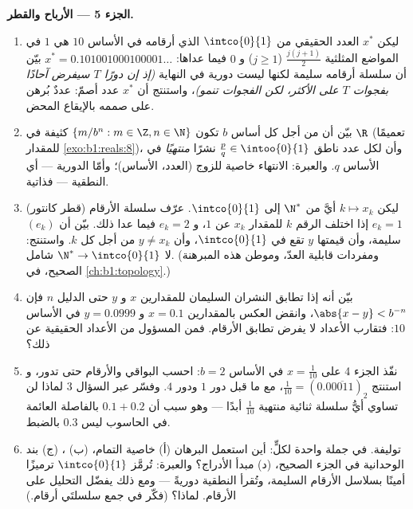 \begin{problem}
\medskip
\noindent\textbf{الجزء 5 --- الأرباح والقطر.}
\begin{enumerate}[resume]
  \item ليكن $x^*$ العدد الحقيقي من $\intco{0}{1}$ الذي أرقامه
        في الأساس $10$ هي $1$ في المواضع المثلثية $\frac{j(j +
        1)}{2}$ ($j \geq 1$) و $0$ فيما عداها: $x^* =
        0.101001000100001\dots$ بيّن أن سلسلة أرقامه
        سليمة لكنها ليست دورية في النهاية \emph{(إذ إن دورًا $T$
        سيفرض آحادًا بفجوات $T$ على الأكثر، لكن الفجوات تنمو)}،
        واستنتج أن $x^*$ عدد أصمّ: عددٌ بُرهن على صممه
        بالإيقاع المحض.
  \item بيّن أن من أجل كل أساس $b$ تكون  $\{m/b^n : m \in \Z,
        n \in \N\}$ كثيفة في $\R$ (تعميمًا للمقدار
        \cref{exo:b1:reals:8})، وأن لكل عدد ناطق $\frac pq
        \in \intoo{0}{1}$ نشرًا \emph{منتهيًا} في
        الأساس $q$. والعبرة: الانتهاء خاصية للزوج
        (العدد، الأساس)؛ وأمّا الدورية --- أي النطقية --- فذاتية.
  \item (قطر كانتور) ليكن $k \mapsto x_k$ أيَّ  من
        $\N^*$ إلى $\intco{0}{1}$. عرّف سلسلة الأرقام $e_k =
        1$ إذا اختلف الرقم $k$ للمقدار $x_k$ عن $1$، و
        $e_k = 2$ فيما عدا ذلك. بيّن أن $(e_k)$ سليمة، وأن
        قيمتها $y$ تقع في $\intco{0}{1}$، وأن $y \neq
        x_k$ من أجل كل $k$. واستنتج: لا  $\N^* \to
        \intco{0}{1}$ شامل. (ومفردات
        قابلية العدّ، وموطن هذه المبرهنة الصحيح، في
        \cref{ch:b1:topology}.)
  \item بيّن أنه إذا تطابق النشران السليمان للمقدارين $x$ و $y$
        حتى الدليل $n$ فإن $\abs{x - y} < b^{-n}$، وانقض
        العكس بالمقدارين $x = 0.1$ و $y = 0.0999$ في الأساس $10$:
        فتقارب الأعداد لا يفرض تطابق الأرقام.
        فمن المسؤول من الأعداد الحقيقية عن ذلك؟
  \item نفّذ الجزء 4 على $x = \frac{1}{10}$ في الأساس $b = 2$:
        احسب البواقي والأرقام حتى تدور، و
        استنتج $\frac{1}{10} = (0.0\overline{0011})_2$، مع
        ما قبل دور $1$ ودور $4$. وفسّر عبر السؤال 3 لماذا
        لن تساوي أيُّ سلسلة ثنائية منتهية $\frac{1}{10}$ أبدًا
        --- وهو سبب أن $0.1 + 0.2$ بالفاصلة العائمة في الحاسوب
        ليس $0.3$ بالضبط.
  \item توليفة. في جملة واحدة لكلٍّ: أين استعمل البرهان
        (أ) خاصية التمام، (ب) ، (ج)
        بند الوحدانية في الجزء الصحيح، (د) مبدأ الأدراج؟
        والعبرة: تُرمَّز $\intco{0}{1}$ ترميزًا أمينًا
        بسلاسل الأرقام السليمة، وتُقرأ النطقية دوريةً
        --- ومع ذلك يفضّل التحليل  على
        الأرقام. لماذا؟ (فكّر في جمع سلسلتَي أرقام.)
\end{enumerate}
\end{problem}
